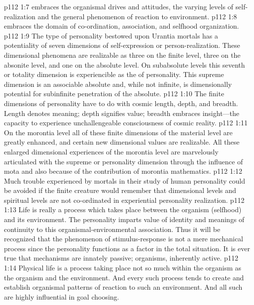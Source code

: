 \pc \vs p112 1:7 \bibnobreakspace {} embraces the organismal drives and attitudes, the varying levels of self\hyp{}realization and the general phenomenon of reaction to environment.
\pc \vs p112 1:8 \bibnobreakspace {} embraces the domain of co\hyp{}ordination, association, and selfhood organization.
\pc \vs p112 1:9 The type of personality bestowed upon Urantia mortals has a potentiality of seven dimensions of self\hyp{}expression or person\hyp{}realization. These dimensional phenomena are realizable as three on the finite level, three on the absonite level, and one on the absolute level. On subabsolute levels this seventh or totality dimension is experiencible as the  of personality. This supreme dimension is an associable absolute and, while not infinite, is dimensionally potential for subinfinite penetration of the absolute.
\vs p112 1:10 The finite dimensions of personality have to do with cosmic length, depth, and breadth. Length denotes meaning; depth signifies value; breadth embraces insight---the capacity to experience unchallengeable consciousness of cosmic reality.
\vs p112 1:11 On the morontia level all of these finite dimensions of the material level are greatly enhanced, and certain new dimensional values are realizable. All these enlarged dimensional experiences of the morontia level are marvelously articulated with the supreme or personality dimension through the influence of mota and also because of the contribution of morontia mathematics.
\vs p112 1:12 Much trouble experienced by mortals in their study of human personality could be avoided if the finite creature would remember that dimensional levels and spiritual levels are not co\hyp{}ordinated in experiential personality realization.
\pc \vs p112 1:13 Life is really a process which takes place between the organism (selfhood) and its environment. The personality imparts value of identity and meanings of continuity to this organismal\hyp{}environmental association. Thus it will be recognized that the phenomenon of stimulus\hyp{}response is not a mere mechanical process since the personality functions as a factor in the total situation. It is ever true that mechanisms are innately passive; organisms, inherently active.
\vs p112 1:14 Physical life is a process taking place not so much within the organism as  the organism and the environment. And every such process tends to create and establish organismal patterns of reaction to such an environment. And all such  are highly influential in goal choosing.
